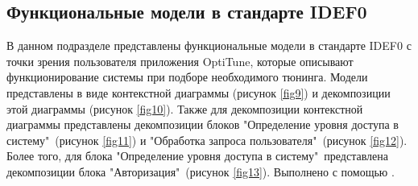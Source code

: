 \documentclass[14pt]{extreport}
\begin{document}
\subsection{Функциональные модели в стандарте IDEF0}

В данном подразделе представлены функциональные модели в стандарте IDEF0 с точки зрения пользователя приложения OptiTune, которые описывают функционирование системы при подборе необходимого тюнинга. Модели представлены в виде контекстной диаграммы (рисунок \ref{fig9}) и декомпозиции этой диаграммы  (рисунок \ref{fig10}). Также для декомпозиции контекстной диаграммы представлены декомпозиции блоков "Определение уровня доступа в систему"\ (рисунок \ref{fig11}) и "Обработка запроса пользователя"\ (рисунок \ref{fig12}). Более того, для блока "Определение уровня доступа в систему"\ представлена декомпозиции блока "Авторизация"\ (рисунок \ref{fig13}). Выполнено с помощью \cite{bib5}.
\end{document}
